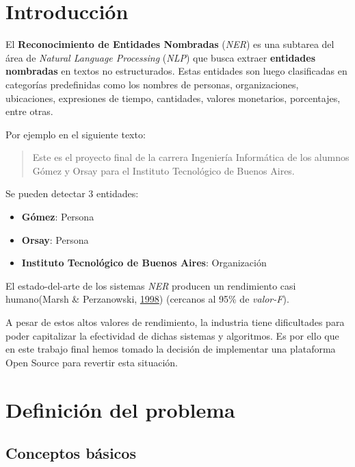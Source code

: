 \documentclass[12pt,a4paper,]{scrartcl}
\providecommand{\tightlist}{%
  \setlength{\itemsep}{0pt}\setlength{\parskip}{0pt}}
\begin{document}
{
\setcounter{tocdepth}{2}
\tableofcontents
}
\newpage

\hypertarget{intro}{%
\section{Introducción}\label{intro}}

El \textbf{Reconocimiento de Entidades Nombradas} (\emph{NER}) es una subtarea del área de \emph{Natural Language Processing} (\emph{NLP}) que busca extraer \textbf{entidades nombradas} en textos no estructurados. Estas entidades son luego clasificadas en categorías predefinidas como los nombres de personas, organizaciones, ubicaciones, expresiones de tiempo, cantidades, valores monetarios, porcentajes, entre otras.

Por ejemplo en el siguiente texto:

\begin{quote}
Este es el proyecto final de la carrera Ingeniería Informática de los alumnos Gómez y Orsay para el Instituto Tecnológico de Buenos Aires.
\end{quote}

Se pueden detectar 3 entidades:

\begin{itemize}
\tightlist
\item
  \textbf{Gómez}: Persona
\item
  \textbf{Orsay}: Persona
\item
  \textbf{Instituto Tecnológico de Buenos Aires}: Organización
\end{itemize}

El estado-del-arte de los sistemas \emph{NER} producen un rendimiento casi humano(Marsh \& Perzanowski, \protect\hyperlink{ref-marsh-perzanowski-1998-muc}{1998}) (cercanos al 95\% de \emph{valor-F}).

A pesar de estos altos valores de rendimiento, la industria tiene dificultades para poder capitalizar la efectividad de dichas sistemas y algoritmos.
Es por ello que en este trabajo final hemos tomado la decisión de implementar una plataforma Open Source para revertir esta situación.

\newpage

\hypertarget{problem-definition}{%
\section{Definición del problema}\label{problem-definition}}

\hypertarget{conceptos-buxe1sicos}{%
\subsection{Conceptos básicos}\label{conceptos-buxe1sicos}}
\end{document}
